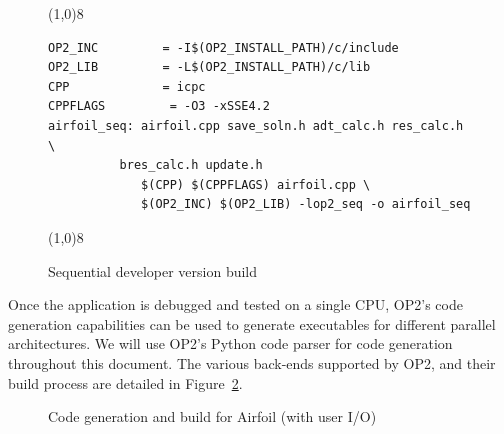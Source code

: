 \documentclass[11pt]{article}
\begin{document}
\begin{figure}[!h]\small
\vspace{-0pt}\noindent\line(1,0){8}\vspace{-10pt}
\begin{lstlisting}
OP2_INC         = -I$(OP2_INSTALL_PATH)/c/include
OP2_LIB         = -L$(OP2_INSTALL_PATH)/c/lib
CPP             = icpc
CPPFLAGS         = -O3 -xSSE4.2 
airfoil_seq: airfoil.cpp save_soln.h adt_calc.h res_calc.h \
	      bres_calc.h update.h
             $(CPP) $(CPPFLAGS) airfoil.cpp \
             $(OP2_INC) $(OP2_LIB) -lop2_seq -o airfoil_seq 
\end{lstlisting}\vspace{-10pt}
\vspace{-0pt}\noindent\line(1,0){8}\vspace{-10pt}
\caption{\small Sequential developer version build }
\normalsize\vspace{-10pt}\label{fig:seqbuild}
\end{figure}

\noindent Once the application is debugged and tested on a single CPU, OP2's code generation capabilities can be used
to generate executables for different parallel architectures. We will use OP2's Python code parser for code generation
throughout this document. The various back-ends supported by OP2, and their build process are detailed in
Figure~\ref{fig/build-paths}. 

\begin{figure}[!ht]\centering\vspace{0pt}
\caption{Code generation and build for Airfoil (with user I/O)}\label{fig/build-paths}\vspace{-5pt}
\end{figure}
\end{document}
